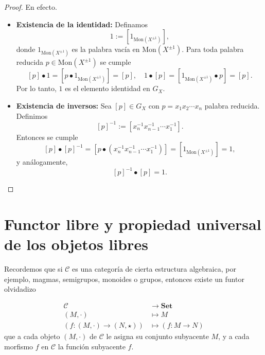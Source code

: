 \begin{proof}
	En efecto.
	\begin{itemize}
		\item \textbf{Existencia de la identidad:} Definamos
		\[
		1 := [1_{\mathrm{Mon}(X^{\pm 1})}],
		\]
		donde \(1_{\mathrm{Mon}(X^{\pm 1})}\) es la palabra vacía en \(\mathrm{Mon}(X^{\pm 1})\). Para toda palabra reducida \(p \in \mathrm{Mon}(X^{\pm 1})\) se cumple
		\[
		[p] \bullet 1 = [p \bullet 1_{\mathrm{Mon}(X^{\pm 1})}] = [p], \quad 1 \bullet [p] = [1_{\mathrm{Mon}(X^{\pm 1})} \bullet p] = [p].
		\]
		Por lo tanto, \(1\) es el elemento identidad en \(G_X\).
		
		\item \textbf{Existencia de inversos:} Sea \([p] \in G_X\) con \(p = x_1 x_2 \cdots x_n\) palabra reducida. Definimos
		\[
		[p]^{-1} := [x_n^{-1} x_{n-1}^{-1} \cdots x_1^{-1}].
		\]
		Entonces se cumple
		\[
		[p] \bullet [p]^{-1} = [p \bullet (x_n^{-1} x_{n-1}^{-1} \cdots x_1^{-1})] = [1_{\mathrm{Mon}(X^{\pm 1})}] = 1,
		\]
		y análogamente,
		\[
		[p]^{-1} \bullet [p] = 1.
		\]
	\end{itemize}
\end{proof}



\begin{definicion}
\end{definicion}

\begin{observacion}
\end{observacion}


\section{Functor libre y propiedad universal de los objetos libres}


\noindent Recordemos que si \(\mathcal{C}\) es una categoría de cierta estructura algebraica, por ejemplo, magmas, semigrupos, monoides o grupos, entonces existe un funtor olvidadizo



\[
\begin{aligned}
	\mathcal{C} & \longrightarrow \mathbf{Set} \\
	(M, \cdot) & \longmapsto M \\
	\left(f : (M, \cdot) \to (N, \star)\right) & \longmapsto \left(f : M \to N\right)
\end{aligned}
\]que a cada objeto \((M, \cdot)\) de \(\mathcal{C}\) le asigna su conjunto subyacente \(M\), y a cada morfismo \(f\) en \(\mathcal{C}\) la función subyacente \(f\).\\

